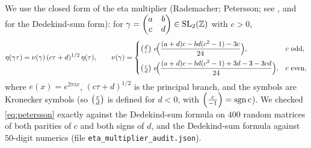 We use the closed form of the eta multiplier (Rademacher; Petersson; see
\citealp[Ch.~4, \S4.1]{Knopp70}, and \citealp[Thm.~3.4]{Apostol90} for the Dedekind-sum form):
for $\gamma=\begin{pmatrix}a&b\\c&d\end{pmatrix}\in\mathrm{SL}_2(\mathbb Z)$ with $c>0$,
\begin{equation}\label{eq:petersson}
\eta(\gamma\tau)=\nu(\gamma)\,(c\tau+d)^{1/2}\,\eta(\tau),\qquad
\nu(\gamma)=
\begin{cases}
\leg{d}{c}\,e\!\Bigl(\dfrac{(a+d)c-bd(c^2-1)-3c}{24}\Bigr), & c\ \text{odd},\\[2ex]
\leg{c}{d}\,e\!\Bigl(\dfrac{(a+d)c-bd(c^2-1)+3d-3-3cd}{24}\Bigr), & c\ \text{even},
\end{cases}
\end{equation}
where $e(x)=e^{2\pi ix}$, $(c\tau+d)^{1/2}$ is the principal branch, and the symbols are Kronecker
symbols (so $\left(\frac{c}{d}\right)$ is defined for $d<0$, with $\left(\frac{c}{-1}\right)=\operatorname{sgn}c$). We checked
\eqref{eq:petersson} exactly against the Dedekind-sum formula on $400$ random matrices of both
parities of $c$ and both signs of $d$, and the Dedekind-sum formula against $50$-digit numerics
(file \texttt{eta\_multiplier\_audit.json}).

